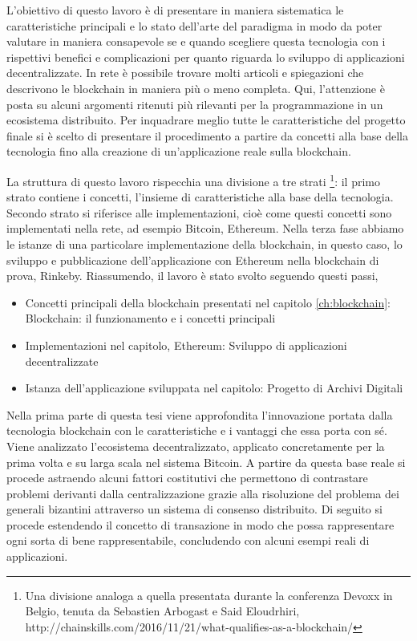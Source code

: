 L’obiettivo di questo lavoro è di presentare in maniera sistematica le caratteristiche principali e lo stato dell’arte del paradigma in modo da poter valutare in maniera consapevole se e quando scegliere questa tecnologia con i rispettivi benefici e complicazioni per quanto riguarda lo sviluppo di applicazioni decentralizzate. In rete è possibile trovare molti articoli e spiegazioni che descrivono le blockchain in maniera più o meno completa. Qui, l’attenzione è posta su alcuni argomenti ritenuti più rilevanti per la programmazione in un ecosistema distribuito. Per inquadrare meglio tutte le caratteristiche del progetto finale si è scelto di presentare il procedimento a partire da concetti alla base della tecnologia fino alla creazione di un'applicazione reale sulla blockchain. 

La struttura di questo lavoro rispecchia una divisione a tre strati \footnote{Una divisione analoga a quella presentata durante la conferenza Devoxx in Belgio, tenuta da Sebastien Arbogast e Said Eloudrhiri, http://chainskills.com/2016/11/21/what-qualifies-as-a-blockchain/}: il primo strato contiene i concetti, l’insieme di caratteristiche alla base della tecnologia. Secondo strato si riferisce alle implementazioni, cioè come questi concetti sono implementati nella rete, ad esempio Bitcoin, Ethereum. Nella terza fase abbiamo le istanze di una particolare implementazione della blockchain, in questo caso, lo sviluppo e pubblicazione dell’applicazione con Ethereum nella blockchain di prova, Rinkeby. Riassumendo, il lavoro è stato svolto seguendo questi passi,

\begin{itemize}
\item Concetti principali della blockchain presentati nel capitolo \ref{ch:blockchain}: Blockchain: il funzionamento e i concetti principali
\item Implementazioni nel capitolo, Ethereum: Sviluppo di applicazioni decentralizzate
\item Istanza dell’applicazione sviluppata nel capitolo: Progetto di Archivi Digitali
\end{itemize}

Nella prima parte di questa tesi viene approfondita l’innovazione portata dalla tecnologia blockchain con le caratteristiche e i vantaggi che essa porta con sé. Viene analizzato l’ecosistema decentralizzato, applicato concretamente per la prima volta e su larga scala nel sistema Bitcoin. A partire da questa base reale si procede astraendo alcuni fattori costitutivi che permettono di contrastare problemi derivanti dalla centralizzazione grazie alla risoluzione del problema dei generali bizantini attraverso un sistema di consenso distribuito.
Di seguito si procede estendendo il concetto di transazione in modo che possa rappresentare ogni sorta di bene rappresentabile, concludendo con alcuni esempi reali di applicazioni.

